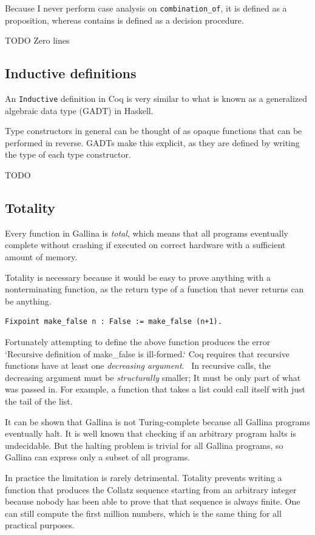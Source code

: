 \documentclass[english, 12pt, a4paper, sci, a-1b, online]{aaltothesis}
\newcommand\icoq[1]{\texttt{#1}}
\begin{document}
Because I never perform case analysis on \icoq{combination_of}, it is defined as a proposition, whereas contains is defined as a decision procedure.

TODO Zero lines

\subsection{Inductive definitions}

An \icoq{Inductive} definition in Coq is very similar to what is known as a generalized algebraic data type (GADT) in Haskell.

Type constructors in general can be thought of as opaque functions that can be performed in reverse. GADTs make this explicit, as they are defined by writing the type of each type constructor.

TODO

\subsection{Totality}

Every function in Gallina is \emph{total}, which means that all programs eventually complete without crashing if executed on correct hardware with a sufficient amount of memory.

Totality is necessary because it would be easy to prove anything with a nonterminating function, as the return type of a function that never returns can be anything.
\begin{verbatim}
Fixpoint make_false n : False := make_false (n+1).
\end{verbatim}
Fortunately attempting to define the above function produces the error `Recursive definition of make\_false is ill-formed.` Coq requires that recursive functions have at least one \emph{decreasing argument}.~\cite{coqRefman} In recursive calls, the decreasing argument must be \emph{structurally} smaller; It must be only part of what was passed in. For example, a function that takes a list could call itself with just the tail of the list.

It can be shown that Gallina is not Turing-complete because all Gallina programs eventually halt. It is well known that checking if an arbitrary program halts is undecidable. But the halting problem is trivial for all Gallina programs, so Gallina can express only a subset of all programs.

In practice the limitation is rarely detrimental. Totality prevents writing a function that produces the Collatz sequence starting from an arbitrary integer because nobody has been able to prove that that sequence is always finite. One can still compute the first million numbers, which is the same thing for all practical purposes.
\end{document}
